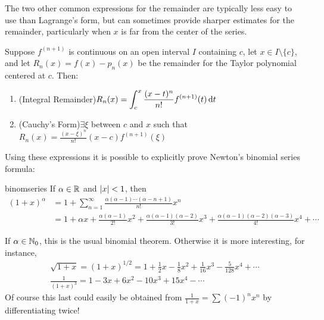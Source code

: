 


The two other common expressions for the remainder are typically less easy to use than Lagrange's form, but can sometimes provide sharper estimates for the remainder, particularly when $x$ is far from the center of the series.

\begin{cor}[breakable]{}{}
Suppose $f^{(n+1)}$ is continuous on an open interval $I$ containing $c$, let $x\in I\setminus\{c\}$, and let $R_n(x)=f(x)-p_n(x)$ be the remainder for the Taylor polynomial centered at $c$. Then:
\begin{enumerate}
  \item (Integral Remainder)\quad $\displaystyle R_n(x)=\int_c^x\frac{(x-t)^n}{n!}f^{(n+1)}(t)\,{\mathrm{d} t}$
	\item (Cauchy's Form)\quad $\exists\xi$ between $c$ and $x$ such that \
	$\displaystyle R_n(x)=\frac{(x-\xi)^{n}}{n!}(x-c)f^{(n+1)}(\xi)$
\end{enumerate} 
\end{cor}

\goodbreak

Using these expressions it is possible to explicitly prove Newton's binomial series formula:

\begin{thm}{}{binomseries}
If $\alpha\in\mathbb{R}$ and $\left| x\right|<1$, then
\begin{align*}
(1+x)^\alpha&=1+\sum_{n=1}^\infty\frac{\alpha(\alpha-1)\cdots(\alpha-n+1)}{n!}x^n\\
&=1+\alpha x+\frac{\alpha(\alpha-1)}{2!}x^2 +\frac{\alpha(\alpha-1)(\alpha-2)}{3!}x^3 +\frac{\alpha(\alpha-1)(\alpha-2)(\alpha-3)}{4!}x^4 +\cdots
\end{align*}
\end{thm}

If $\alpha\in\mathbb{N}_0$, this is the usual binomial theorem. Otherwise it is more interesting, for instance,
\begin{gather*}
\sqrt{1+x}=(1+x)^{1/2}=1+\frac 12x-\frac 18x^2+\frac 1{16}x^3-\frac 5{128}x^4+\cdots\\
\frac 1{(1+x)^3}=1-3x+6x^2-10x^3+15x^4-\cdots
\end{gather*}
Of course this last could easily be obtained from $\frac 1{1+x}=\sum (-1)^nx^n$ by differentiating twice!




